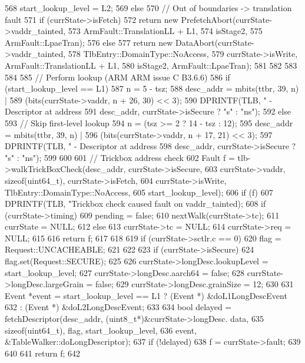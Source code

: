 \begin{DoxyCode}
{{{568                 start_lookup_level = L2;
569         } else {
570             // Out of boundaries -> translation fault
571             if (currState->isFetch)
572                 return new PrefetchAbort(currState->vaddr_tainted,
573                                          ArmFault::TranslationLL + L1,
574                                          isStage2,
575                                          ArmFault::LpaeTran);
576             else
577                 return new DataAbort(currState->vaddr_tainted,
578                                      TlbEntry::DomainType::NoAccess,
579                                      currState->isWrite, ArmFault::TranslationLL 
      + L1,
580                                      isStage2, ArmFault::LpaeTran);
581         }
582 
583     }
584 
585     // Perform lookup (ARM ARM issue C B3.6.6)
586     if (start_lookup_level == L1) {
587         n = 5 - tsz;
588         desc_addr = mbits(ttbr, 39, n) |
589             (bits(currState->vaddr, n + 26, 30) << 3);
590         DPRINTF(TLB, " - Descriptor at address %
591                 desc_addr, currState->isSecure ? "s" : "ns");
592     } else {
593         // Skip first-level lookup
594         n = (tsz >= 2 ? 14 - tsz : 12);
595         desc_addr = mbits(ttbr, 39, n) |
596             (bits(currState->vaddr, n + 17, 21) << 3);
597         DPRINTF(TLB, " - Descriptor at address %
598                 desc_addr, currState->isSecure ? "s" : "ns");
599     }
600 
601     // Trickbox address check
602     Fault f = tlb->walkTrickBoxCheck(desc_addr, currState->isSecure,
603                         currState->vaddr, sizeof(uint64_t), currState->isFetch,
604                         currState->isWrite, TlbEntry::DomainType::NoAccess,
605                         start_lookup_level);
606     if (f) {
607         DPRINTF(TLB, "Trickbox check caused fault on %
      vaddr_tainted);
608         if (currState->timing) {
609             pending = false;
610             nextWalk(currState->tc);
611             currState = NULL;
612         } else {
613             currState->tc = NULL;
614             currState->req = NULL;
615         }
616         return f;
617     }
618 
619     if (currState->sctlr.c == 0) {
620         flag = Request::UNCACHEABLE;
621     }
622 
623     if (currState->isSecure)
624         flag.set(Request::SECURE);
625 
626     currState->longDesc.lookupLevel = start_lookup_level;
627     currState->longDesc.aarch64 = false;
628     currState->longDesc.largeGrain = false;
629     currState->longDesc.grainSize = 12;
630 
631     Event *event = start_lookup_level == L1 ? (Event *) &doL1LongDescEvent
632                                             : (Event *) &doL2LongDescEvent;
633 
634     bool delayed = fetchDescriptor(desc_addr, (uint8_t*)&currState->longDesc.
      data,
635                                    sizeof(uint64_t), flag, start_lookup_level,
636                                    event, &TableWalker::doLongDescriptor);
637     if (!delayed) {
638         f = currState->fault;
639     }
640 
641     return f;
642 }
\end{DoxyCode}
